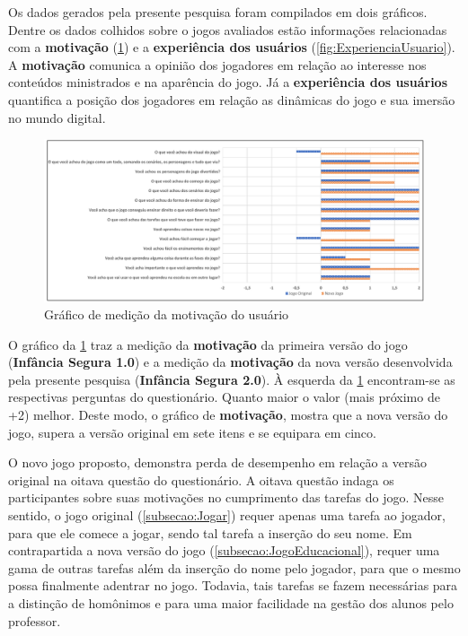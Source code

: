 \documentclass[alpha-refs,brazilian]{RBCA_v2.0}
\begin{document}
Os dados gerados pela presente pesquisa foram compilados em dois gráficos. Dentre os dados colhidos sobre o jogos avaliados estão informações relacionadas com a \textbf{motivação} (\cref{fig:Motivacao}) e a \textbf{experiência dos usuários} (\cref{fig:ExperienciaUsuario}). A \textbf{motivação} comunica a opinião dos jogadores em relação ao interesse nos conteúdos ministrados e na aparência do jogo. Já a \textbf{experiência dos usuários} quantifica a posição dos jogadores em relação as dinâmicas do jogo e sua imersão no mundo digital.

\newpage

\begin{figure}[ht]
  \centering
  \includegraphics[width=\linewidth]{Resultados/Motivacao.pdf}
  \caption{Gráfico de medição da motivação do usuário}
  \label{fig:Motivacao}
\end{figure} 


O gráfico da \cref{fig:Motivacao} traz a medição da \textbf{motivação} da primeira versão do jogo (\textbf{Infância Segura 1.0}) e a medição da \textbf{motivação} da nova versão desenvolvida pela presente pesquisa (\textbf{Infância Segura 2.0}). À esquerda da \cref{fig:Motivacao} encontram-se as respectivas perguntas do questionário. Quanto maior o valor (mais próximo de +2) melhor. Deste modo, o gráfico de \textbf{motivação}, mostra que a nova versão do jogo, supera a versão original em sete itens e se equipara em cinco.

O novo jogo proposto, demonstra perda de desempenho em relação a versão original na oitava questão do questionário. A oitava questão indaga os participantes sobre suas motivações no cumprimento das tarefas do jogo. Nesse sentido, o jogo original (\cref{subsecao:Jogar}) requer apenas uma tarefa ao jogador, para que ele comece a jogar, sendo tal tarefa a inserção do seu nome. Em contrapartida a nova versão do jogo (\cref{subsecao:JogoEducacional}), requer uma gama de outras tarefas além da inserção do nome pelo jogador, para que o mesmo possa finalmente adentrar no jogo. %
Todavia, tais tarefas se fazem necessárias para a distinção de homônimos e para uma maior facilidade na gestão dos alunos pelo professor.
\end{document}
